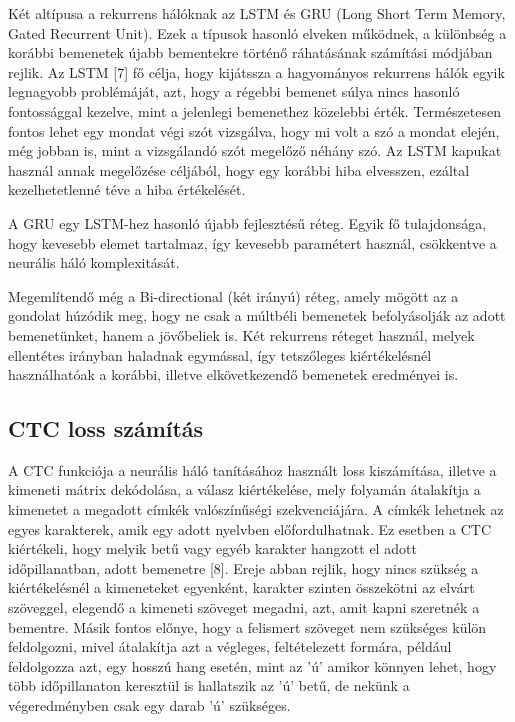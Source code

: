 
Két altípusa a rekurrens hálóknak az LSTM és GRU (Long Short Term Memory, Gated Recurrent Unit). Ezek a típusok hasonló elveken működnek, a különbség a korábbi bemenetek újabb bementekre történő ráhatásának számítási módjában rejlik. Az LSTM [7] fő célja, hogy kijátssza a hagyományos rekurrens hálók egyik legnagyobb problémáját, azt, hogy a régebbi bemenet súlya nincs hasonló fontossággal kezelve, mint a jelenlegi bemenethez közelebbi érték. Természetesen fontos lehet egy mondat végi szót vizsgálva, hogy mi volt a szó a mondat elején, még jobban is, mint a vizsgálandó szót megelőző néhány szó. Az LSTM kapukat használ annak megelőzése céljából, hogy egy korábbi hiba elvesszen, ezáltal kezelhetetlenné téve a hiba értékelését.

A GRU egy LSTM-hez hasonló újabb fejlesztésű réteg. Egyik fő tulajdonsága, hogy kevesebb elemet tartalmaz, így kevesebb paramétert használ, csökkentve a neurális háló komplexitását.

Megemlítendő még a Bi-directional (két irányú) réteg, amely mögött az a gondolat húzódik meg, hogy ne csak a múltbéli bemenetek befolyásolják az adott bemenetünket, hanem a jövőbeliek is. Két rekurrens réteget használ, melyek ellentétes irányban haladnak egymással, így tetszőleges kiértékelésnél használhatóak a korábbi, illetve elkövetkezendő bemenetek eredményei is.

\subsection{CTC loss számítás}

A CTC funkciója a neurális háló tanításához használt loss kiszámítása, illetve a kimeneti mátrix dekódolása, a válasz kiértékelése, mely folyamán átalakítja a kimenetet a megadott címkék valószínűségi szekvenciájára. A címkék lehetnek az egyes karakterek, amik egy adott nyelvben előfordulhatnak. Ez esetben a CTC kiértékeli, hogy melyik betű vagy egyéb karakter hangzott el adott időpillanatban, adott bemenetre [8]. Ereje abban rejlik, hogy nincs szükség a kiértékelésnél a kimeneteket egyenként, karakter szinten összekötni az elvárt szöveggel, elegendő a kimeneti szöveget megadni, azt, amit kapni szeretnék a bementre. Másik fontos előnye, hogy a felismert szöveget nem szükséges külön feldolgozni, mivel átalakítja azt a végleges, feltételezett formára, például feldolgozza azt, egy hosszú hang esetén, mint az ’ú’ amikor könnyen lehet, hogy több időpillanaton keresztül is hallatszik az ’ú’ betű, de nekünk a végeredményben csak egy darab ’ú’ szükséges.

